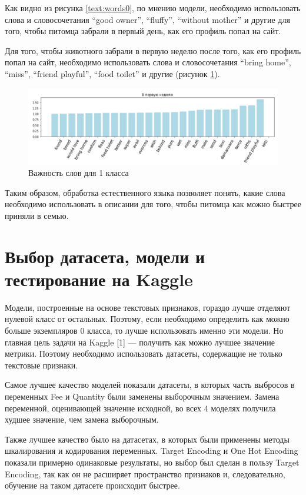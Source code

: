 \documentclass[14pt]{mmcs_article}
\begin{document}
Как видно из рисунка \ref{text:words0}, по мнению модели, необходимо использовать слова и словосочетания “good owner”, “fluffy”, “without mother” и другие для того, чтобы питомца забрали в первый день, как его профиль попал на сайт.

Для того, чтобы животного забрали в первую неделю после того, как его профиль попал на сайт, необходимо использовать слова и словосочетания “bring home”, “miss”, “friend playful”, “food toilet” и другие (рисунок \ref{text:words1}).


\begin{figure}[H]
	\centering
	\includegraphics[scale=0.6]{words1.png}
	\caption{Важность слов для 1 класса}\label{text:words1}
\end{figure}

Таким образом, обработка естественного языка позволяет понять, какие слова необходимо использовать в описании для того, чтобы питомца как можно быстрее приняли в семью.


\newpage
\section{Выбор датасета, модели и тестирование на Kaggle}

Модели, построенные на основе текстовых признаков, гораздо лучше отделяют нулевой класс от остальных. Поэтому, если необходимо определить как можно больше экземпляров 0 класса, то лучше использовать именно эти модели.
Но главная цель задачи на Kaggle [1] — получить как можно лучшее значение метрики. Поэтому необходимо использовать датасеты, содержащие не только текстовые признаки. 

Самое лучшее качество моделей показали датасеты, в которых часть выбросов в переменных Fee и Quantity были заменены выборочным значением. Замена переменной, оценивающей значение исходной, во всех 4 моделях получила худшее значение, чем замена выборочным. 

Также лучшее качество было на датасетах, в которых были применены методы шкалирования и кодирования переменных. Target Encoding и One Hot Encoding показали примерно одинаковые результаты, но выбор был сделан в пользу Target Encoding, так как он не расширяет пространство признаков и, следовательно, обучение на таком датасете происходит быстрее.
\end{document}
